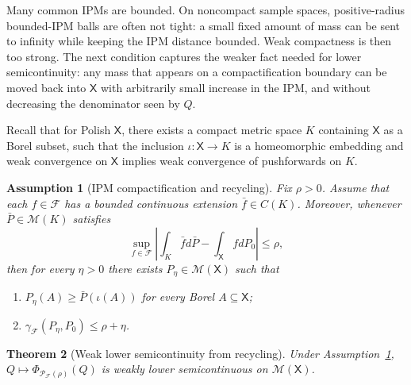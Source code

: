\documentclass[11pt]{article}
\newcommand{\Pcal}{\mathcal{P}}
\newcommand{\Fcal}{\mathcal{F}}
\newcommand{\X}{\mathsf{X}}
\newcommand{\M}{\mathcal{M}}
\newcommand{\dd}{d}
\newtheorem{theorem}{Theorem}[section]
\newtheorem{assumption}[theorem]{Assumption}
\theoremstyle{definition}
\theoremstyle{definition}
\begin{document}
Many common IPMs are bounded.  On noncompact sample spaces, positive-radius bounded-IPM balls are often not tight: a small fixed amount of mass can be sent to infinity while keeping the IPM distance bounded.  Weak compactness is then too strong.  The next condition captures the weaker fact needed for lower semicontinuity: any mass that appears on a compactification boundary can be moved back into \(\X\) with arbitrarily small increase in the IPM, and without decreasing the denominator seen by \(Q\).

Recall that for Polish \(\X\), there exists a compact metric space \(K\) containing \(\X\) as a Borel subset, such that the inclusion \(\iota:\X\to K\) is a homeomorphic embedding and weak convergence on \(\X\) implies weak convergence of pushforwards on \(K\).  

\begin{assumption}[IPM compactification and recycling]\label{ass:ipm-recycle}
Fix \(\rho>0\). Assume that each \(f\in\Fcal\) has a bounded continuous extension \(\bar f\in C(K)\).  Moreover, whenever \(\bar P\in\M(K)\) satisfies
\begin{equation}\label{eq:extended-ipm-ball}
  \sup_{f\in\Fcal}\left|\int_K \bar f\dd\bar P-\int_\X f\dd P_0\right|\le \rho,
\end{equation}
then for every \(\eta>0\) there exists \(P_\eta\in\M(\X)\) such that
\begin{enumerate}
\item \(P_\eta(A)\ge \bar P(\iota(A))\) for every Borel \(A\subseteq\X\);
\item \(\gamma_{\Fcal}(P_\eta,P_0)\le \rho+\eta\).
\end{enumerate}
\end{assumption}
\begin{theorem}[Weak lower semicontinuity from recycling]\label{thm:ipm-recycle-lsc}
Under Assumption~\ref{ass:ipm-recycle}, \(Q\mapsto\Phi_{\Pcal_{\Fcal}(\rho)}(Q)\) is weakly lower semicontinuous on \(\M(\X)\). 
\end{theorem}
\end{document}
